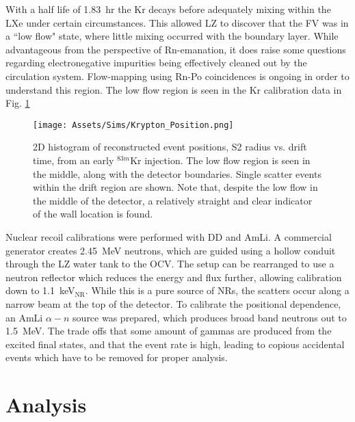 With a half life of 1.83~hr the Kr decays before adequately mixing within the LXe under certain circumstances.
This allowed LZ to discover that the FV was in a ``low flow" state, where little mixing occurred with the boundary layer.
While advantageous from the perspective of Rn-emanation, it does raise some questions regarding electronegative impurities being effectively cleaned out by the circulation system.
Flow-mapping using Rn-Po coincidences is ongoing in order to understand this region.
The low flow region is seen in the Kr calibration data in Fig. \ref{fig:stagnant}
\begin{figure}
    \centering
    \texttt{[image: Assets/Sims/Krypton\_Position.png]}
    \caption[ 2D histogram of reconstructed event positions, S2 radius vs. drift time, from an early $^{83m}$Kr injection.]%
    {
    2D histogram of reconstructed event positions, S2 radius vs. drift time, from an early $^{83m}$Kr injection. The low flow region is seen in the middle, along with the detector boundaries.
    Single scatter events within the drift region are shown.
    Note that, despite the low flow in the middle of the detector, a relatively straight and clear indicator of the wall location is found.}
    \label{fig:stagnant}
\end{figure}

Nuclear recoil calibrations were performed with DD and AmLi.
A commercial generator creates 2.45~MeV neutrons, which are guided using a hollow conduit through the LZ water tank to the OCV.
The setup can be rearranged to use a neutron reflector which reduces the energy and flux further, allowing calibration down to 1.1~keV$_{\mathrm{NR}}$.
While this is a pure source of NRs, the scatters occur along a narrow beam at the top of the detector.
To calibrate the positional dependence, an AmLi $\alpha-n$ source was prepared, which produces broad band neutrons out to 1.5~MeV. 
The trade offs that some amount of gammas are produced from the excited final states, and that the event rate is high, leading to copious accidental events which have to be removed for proper analysis.


\section{Analysis}
